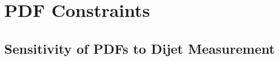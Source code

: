 \chapter{PDF Constraints}

%



\section{Sensitivity of PDFs to Dijet Measurement}
\label{sec:pdf_sensitivity}


